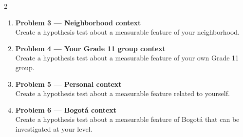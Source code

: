 \documentclass[12pt]{article}
\begin{document}
\begin{multicols}{2}
\begin{enumerate}
\item \textbf{Problem 3 --- Neighborhood context}\\
Create a hypothesis test about a measurable feature of your neighborhood.

\item \textbf{Problem 4 --- Your Grade 11 group context}\\
Create a hypothesis test about a measurable feature of your own Grade 11 group.

\item \textbf{Problem 5 --- Personal context}\\
Create a hypothesis test about a measurable feature related to yourself.

\item \textbf{Problem 6 --- Bogotá context}\\
Create a hypothesis test about a measurable feature of Bogotá that can be investigated at your level.
\end{enumerate}

\end{multicols}
\end{document}
